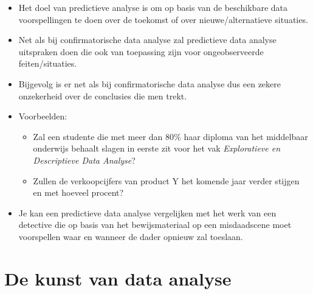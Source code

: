 \documentclass[]{memoir}
\providecommand{\tightlist}{%
  \setlength{\itemsep}{0pt}\setlength{\parskip}{0pt}}
\begin{document}
\begin{itemize}
\tightlist
\item
  Het doel van predictieve analyse is om op basis van de beschikbare data voorspellingen te doen over de toekomst of over nieuwe/alternatieve situaties.
\item
  Net als bij confirmatorische data analyse zal predictieve data analyse uitspraken doen die ook van toepassing zijn voor ongeobserveerde feiten/situaties.
\item
  Bijgevolg is er net als bij confirmatorische data analyse dus een zekere onzekerheid over de conclusies die men trekt.
\item
  Voorbeelden:

  \begin{itemize}
  \tightlist
  \item
    Zal een studente die met meer dan 80\% haar diploma van het middelbaar onderwijs behaalt slagen in eerste zit voor het vak \emph{Exploratieve en Descriptieve Data Analyse}?
  \item
    Zullen de verkoopcijfers van product Y het komende jaar verder stijgen en met hoeveel procent?
  \end{itemize}
\item
  Je kan een predictieve data analyse vergelijken met het werk van een detective die op basis van het bewijsmateriaal op een misdaadscene moet voorspellen waar en wanneer de dader opnieuw zal toeslaan.
\end{itemize}

\hypertarget{de-kunst-van-data-analyse}{%
\section{De kunst van data analyse}\label{de-kunst-van-data-analyse}}
\end{document}
